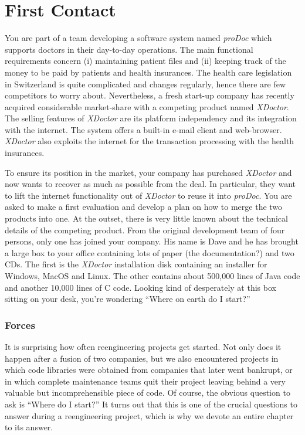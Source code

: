 \documentclass[a4paper,10pt,twoside]{book}
\begin{document}
	\renewcommand{\nnbb}[2]{} %
	\sloppy
\fi
\chapter{First Contact}

You are part of a team developing a software system named \emph{proDoc} which supports doctors in their day-to-day operations.
The main functional requirements concern (i) maintaining patient files and (ii) keeping track of the money to be paid by patients and health insurances. The health care legislation in Switzerland is quite complicated and changes regularly, hence there are few competitors to worry about. Nevertheless, a fresh start-up company has recently acquired considerable market-share with a competing product named \emph{XDoctor}. The selling features of \emph{XDoctor} are its platform independency and its integration with the internet. The system offers a built-in e-mail client and web-browser. \emph{XDoctor} also exploits the internet for the transaction processing with the health insurances.

To ensure its position in the market, your company has purchased \emph{XDoctor} and now wants to recover as much as possible from the deal. In particular, they want to lift the internet functionality out of \emph{XDoctor} to reuse it into \emph{proDoc}. You are asked to make a first evaluation and develop a plan on how to merge the two products into one. At the outset, there is very little known about the technical details of the competing product. From the original development team of four persons, only one has joined your company. His name is Dave and he has brought a large box to your office containing lots of paper (the documentation?) and two CDs. The first is the \emph{XDoctor} installation disk containing an installer for Windows, MacOS and Linux. The other contains about 500,000 lines of Java code and another 10,000 lines of C code. Looking kind of desperately at this box sitting on your desk, you're wondering ``Where on earth do I start?''

\subsection*{Forces}

It is surprising how often reengineering projects get started. Not only does it happen after a fusion of two companies, but we also encountered projects in which code libraries were obtained from companies that later went bankrupt, or in which complete maintenance teams quit their project leaving behind a very valuable but incomprehensible piece of code. Of course, the obvious question to ask is ``Where do I start?'' It turns out that this is one of the crucial questions to answer during a reengineering project, which is why we devote an entire chapter to its answer.
\end{document}
